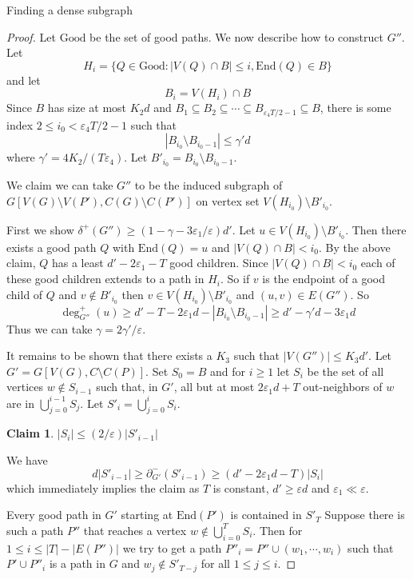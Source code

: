 \documentclass[11pt,a4paper]{article}
\newtheorem{claim}[subsection]{Claim}
\newcommand{\vep}{\varepsilon}
\newcommand{\End}{\mathrm{End}}
\newcommand{\good}{\mathrm{Good}}
\begin{document}
\begin{section}{Finding a dense subgraph}
\begin{proof}
\bigskip

Let $\mathrm{Good}$ be the set of good paths. We now describe how to construct $G''$. Let
\[
H_i = \{ Q \in \good : |V(Q) \cap B| \leq i, \End(Q) \in B \}
\]
and let
\[
B_i = V(H_i) \cap B
\]
Since $B$ has size at most $K_2 d$ and $B_1 \subseteq B_2 \subseteq \cdots \subseteq B_{\vep_4 T/2 - 1} \subseteq B$, there is some index $2 \leq i_0 < \vep_4 T/2 - 1$ such that
\[
|B_{i_0} \setminus B_{i_0 - 1} | \leq \gamma ' d
\]
where $\gamma' = 4 K_2/(T \vep_4)$. Let $B'_{i_0} = B_{i_0} \setminus B_{i_0 - 1}$.

\medskip

We claim we can take $G''$ to be the induced subgraph of $G[V(G) \setminus V(P') , C(G) \setminus C(P')]$ on vertex set $V(H_{i_0}) \setminus B'_{i_0}$.

\medskip

First we show $\delta^+(G'') \geq (1 - \gamma - 3 \vep_1/\vep) d'$. Let $u \in V(H_{i_0}) \setminus B'_{i_0}$. Then there exists a good path $Q$ with $\End(Q) = u$ and $|V(Q) \cap B| < i_0$. By the above claim, $Q$ has a least $d' - 2 \vep_1 - T$ good children. Since $|V(Q) \cap B| < i_0$ each of these good children extends to a path in $H_i$. So if $v$ is the endpoint of a good child of $Q$ and $v \not \in B'_{i_0}$ then $v \in V(H_{i_0}) \setminus B'_{i_0}$ and $(u, v) \in E(G'')$. So
\[
\deg^{+}_{G''}(u) \geq d' - T - 2 \vep_1 d - |B_{i_0} \setminus B_{i_0 - 1}| \geq d' - \gamma' d - 3 \vep_1 d
\]
Thus we can take $\gamma = 2 \gamma'/\vep$.

\medskip

It remains to be shown that there exists a $K_3$ such that $|V(G'')| \leq K_3 d'$. Let $G' = G[V(G), C \setminus C(P)]$. Set $S_0 = B$ and for $i \geq 1$ let $S_i$ be the set of all vertices $w \not \in S_{i - 1}$ such that, in $G'$, all but at most $2 \vep_1 d+ T$ out-neighbors of $w$ are in $\bigcup_{j = 0}^{i - 1} S_{j}$. Let $S'_i = \bigcup_{j = 0}^i S_i$.
\begin{claim} $ |S_i| \leq (2/\vep) |S'_{i-1}|$
\end{claim}
\proof We have
\[
d |S'_{i - 1}| \geq \partial^-_{G'} (S'_{i - 1}) \geq (d' - 2 \vep_1 d - T) |S_i|
\]
which immediately implies the claim as $T$ is constant, $d' \geq \vep d$ and $\vep_1 \ll \vep$.

\medskip

\claim Every good path in $G'$ starting at $\End(P')$ is contained in $S'_T$
\proof Suppose there is such a path $P''$ that reaches a vertex $w \not \in \bigcup_{i = 0}^T S_i$. Then for $1 \leq i \leq |T| - |E(P'')|$ we try to get a path $P''_i = P'' \cup (w_1, \cdots, w_i)$ such that $P' \cup P''_i$ is a path in $G$ and $w_j \not \in S'_{T - j}$ for all $1 \leq j \leq i$.


\end{proof}
\end{section}
\end{document}
